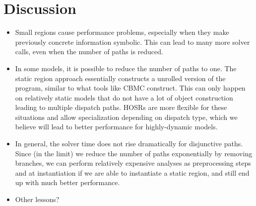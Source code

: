 \section{Discussion}

\begin{itemize}

\item Small regions cause performance problems, especially when they make previously concrete information symbolic.  This can lead to many more solver calls, even when the number of paths is reduced.
    
\item In some models, it is possible to reduce the number of paths to one.  The static region approach essentially constructs a unrolled version of the program, similar to what tools like CBMC construct.   This can only happen on relatively static models that do not have a lot of object construction leading to multiple dispatch paths.  HOSRs are more flexible for these situations and allow specialization depending on dispatch type, which we believe will lead to better performance for highly-dynamic models.
    
\item In general, the solver time does not rise dramatically for disjunctive paths. Since (in the limit) we reduce the number of paths exponentially by removing branches, we can perform relatively expensive analyses as preprocessing steps and at instantiation if we are able to instantiate a static region, and still end up with much better performance. 
    
\item Other lessons?
 
\end{itemize}